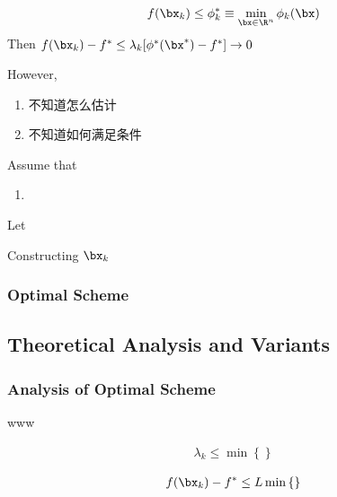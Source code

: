 \begin{lemma}
    \begin{align*}
        f(\bx_k)\le \phi^*_k\equiv \min_{\bx\in\R^n}\phi_k(\bx)
    \end{align*}
    Then $f(\bx_k)-f^*\le \lambda_k[\phi^*(\bx^*)-f^*] \to 0$
\end{lemma}

However, 
\begin{enumerate}
    \item 不知道怎么估计
    \item 不知道如何满足条件
\end{enumerate}

\begin{lemma}
    Assume that 
    \begin{enumerate}
        \item 
    \end{enumerate}
\end{lemma}


\begin{lemma}
    Let 
\end{lemma}

Constructing $\bx_k$

\subsubsection{Optimal Scheme}

\subsection{Theoretical Analysis and Variants}
\subsubsection{Analysis of Optimal Scheme}

\begin{lemma}
    www
\end{lemma}

\begin{lemma}
    \begin{align*}
        \lambda_k\le \min\left\{  \right\}
    \end{align*}
\end{lemma}

\begin{lemma}
    \begin{align*}
        f(\bx_k)-f^*\le L \min\left\{  \right\}
    \end{align*}
\end{lemma}

